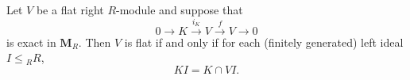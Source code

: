 Let $V$ be a flat right $R$-module and suppose that
$$0 \to K \xrightarrow{i_K} V \xrightarrow{f} V \to 0$$
is exact in $\mathbf{M}_R$. Then $V$ is flat if and only if for each (finitely generated) left ideal $I \leq {}_R R$,
$$KI = K \cap VI.$$
